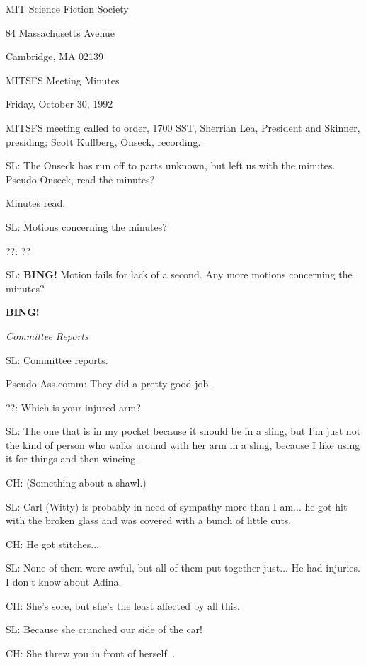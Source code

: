 \documentclass[12pt]{article}
\newcommand{\bing}{{\bf BING!} }
\newcommand{\goto}[1]{\bing \vskip 12pt \centerline{{\em{#1}}}}
\begin{document}
\begin{center}

MIT Science Fiction Society 

84 Massachusetts Avenue

Cambridge, MA 02139

\vspace{12pt}

MITSFS Meeting Minutes 

Friday, October 30, 1992

\end{center}
 
\vspace{18pt}

\setlength{\parskip}{6pt}

\noindent
MITSFS meeting called to order, 1700 SST,
Sherrian Lea, President and Skinner, presiding; Scott Kullberg, Onseck, recording.

SL: The Onseck has run off to parts unknown, but left us with the minutes. Pseudo-Onseck, read the minutes?

Minutes read.

SL: Motions concerning the minutes?

??: ??

SL: \bing Motion fails for lack of a second. Any more motions concerning the minutes?

\goto{Committee Reports}

SL: Committee reports.

Pseudo-Ass.comm: They did a pretty good job.

??: Which is your injured arm?

SL: The one that is in my pocket because it should be in a sling, but I'm just not the kind of person who walks around with her arm in a sling, because I like using it for things and then wincing.

CH: (Something about a shawl.)

SL: Carl (Witty) is probably in need of sympathy more than I am... he got hit with the broken glass and was covered with a bunch of little cuts.

CH: He got stitches...

SL: None of them were awful, but all of them put together just... He had injuries. I don't know about Adina.

CH: She's sore, but she's the least affected by all this.

SL: Because she crunched our side of the car!

CH: She threw you in front of herself...
\end{document}
